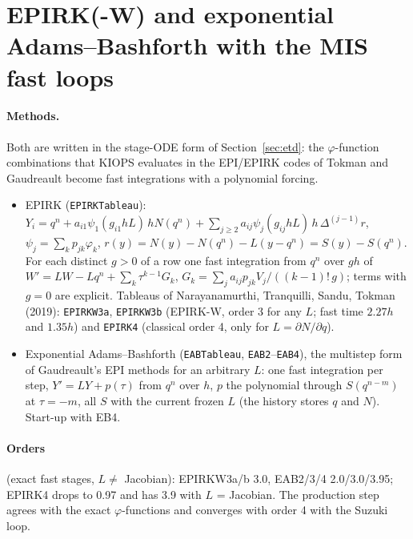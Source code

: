 \documentclass[11pt,a4paper]{article}
\newcommand{\code}[1]{\texttt{#1}}
\begin{document}
\section{EPIRK(-W) and exponential Adams--Bashforth with the MIS fast loops}\label{sec:epirk}

\paragraph{Methods.} Both are written in the stage-ODE form of Section~\ref{sec:etd}: the
$\varphi$-function combinations that KIOPS evaluates in the EPI/EPIRK codes of Tokman and Gaudreault
become fast integrations with a polynomial forcing.
\begin{itemize}
\item EPIRK (\code{EPIRKTableau}):
  $Y_i = q^n + a_{i1}\psi_1(g_{i1}hL)\,hN(q^n) + \sum_{j\ge2} a_{ij}\psi_j(g_{ij}hL)\,h\,\Delta^{(j-1)}r$,
  $\psi_j=\sum_k p_{jk}\varphi_k$, $r(y)=N(y)-N(q^n)-L(y-q^n)=S(y)-S(q^n)$. For each distinct $g>0$ of a
  row one fast integration from $q^n$ over $gh$ of $W' = LW - Lq^n + \sum_k\tau^{k-1}G_k$,
  $G_k=\sum_j a_{ij}p_{jk}V_j/((k-1)!\,g)$; terms with $g=0$ are explicit. Tableaus of Narayanamurthi,
  Tranquilli, Sandu, Tokman (2019): \code{EPIRKW3a}, \code{EPIRKW3b} (EPIRK-W, order 3 for any $L$;
  fast time $2.27h$ and $1.35h$) and \code{EPIRK4} (classical order 4, only for $L=\partial N/\partial q$).
\item Exponential Adams--Bashforth (\code{EABTableau}, \code{EAB2}--\code{EAB4}), the multistep form of
  Gaudreault's EPI methods for an arbitrary $L$: one fast integration per step, $Y'=LY+p(\tau)$ from
  $q^n$ over $h$, $p$ the polynomial through $S(q^{n-m})$ at $\tau=-m$, all $S$ with the current frozen
  $L$ (the history stores $q$ and $N$). Start-up with EB4.
\end{itemize}

\paragraph{Orders} (exact fast stages, $L\ne$ Jacobian): EPIRKW3a/b 3.0, EAB2/3/4 2.0/3.0/3.95;
EPIRK4 drops to 0.97 and has 3.9 with $L$ = Jacobian. The production step agrees with the exact
$\varphi$-functions and converges with order 4 with the Suzuki loop.
\end{document}
